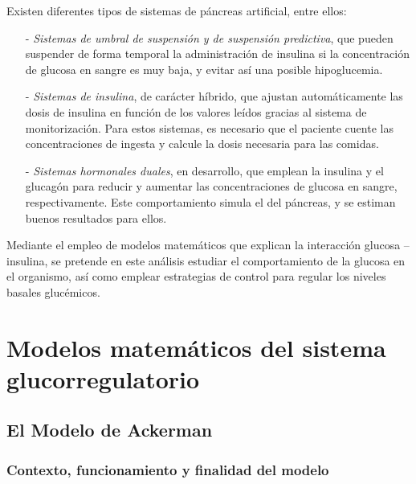 Existen diferentes tipos de sistemas de páncreas artificial, entre ellos: 
\begin{enumerate}
    \item[-] \textit{Sistemas de umbral de suspensión y de suspensión predictiva}, que pueden suspender de forma temporal la administración de insulina si la concentración de glucosa en sangre es muy baja, y evitar así una posible hipoglucemia.
    \item[-] \textit{Sistemas de insulina}, de carácter híbrido, que ajustan automáticamente las dosis de insulina en función de los valores leídos gracias al sistema de monitorización. Para estos sistemas, es necesario que el paciente cuente las concentraciones de ingesta y calcule la dosis necesaria para las comidas.
    \item[-] \textit{Sistemas hormonales duales}, en desarrollo, que emplean la insulina y el glucagón para reducir y aumentar las concentraciones de glucosa en sangre, respectivamente. Este comportamiento simula el del páncreas, y se estiman buenos resultados para ellos. 
\end{enumerate}

Mediante el empleo de modelos matemáticos que explican la interacción glucosa – insulina, se pretende en este análisis estudiar el comportamiento de la glucosa en el organismo, así como emplear estrategias de control para regular los niveles basales glucémicos.

\section{Modelos matemáticos del sistema glucorregulatorio}

\subsection{El Modelo de Ackerman}

\subsubsection{Contexto, funcionamiento y finalidad del modelo}

